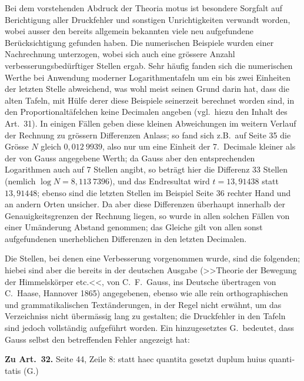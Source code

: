 \documentclass[11pt,a4paper]{article}
\begin{document}

Bei dem vorstehenden Abdruck der Theoria motus ist besondere Sorgfalt auf Berichtigung aller Druckfehler und sonstigen Unrichtigkeiten verwandt worden, wobei ausser den bereits allgemein bekannten viele neu aufgefundene Berücksichtigung gefunden haben. Die numerischen Beispiele wurden einer Nachrechnung unterzogen, wobei sich auch eine grössere Anzahl verbesserungsbedürftiger Stellen ergab. Sehr häufig fanden sich die numerischen Werthe bei Anwendung moderner Logarithmentafeln um ein bis zwei Einheiten der letzten Stelle abweichend, was wohl meist seinen Grund darin hat, dass die alten Tafeln, mit Hülfe derer diese Beispiele seinerzeit berechnet worden sind, in den Proportionaltäfelchen keine Decimalen angeben (vgl.\ hiezu den Inhalt des Art.~31). In einigen Fällen geben diese kleinen Abweichungen im weitern Verlauf der Rechnung zu grössern Differenzen Anlass; so fand sich z.B.\ auf Seite 35 die Grösse $N$ gleich $0{,}012\ 9939$, also nur um eine Einheit der 7.\ Decimale kleiner als der von Gauss angegebene Werth; da Gauss aber den entsprechenden Logarithmen auch auf 7 Stellen angibt, so beträgt hier die Differenz 33 Stellen (nemlich $\log N = 8{,}113\ 7396$), und das Endresultat wird $t = 13{,}91438$ statt $13{,}91448$; ebenso sind die letzten Stellen im Beispiel Seite 36 rechter Hand und an andern Orten unsicher. Da aber diese Differenzen überhaupt innerhalb der Genauigkeitsgrenzen der Rechnung liegen, so wurde in allen solchen Fällen von einer Umänderung Abstand genommen; das Gleiche gilt von allen sonst aufgefundenen unerheblichen Differenzen in den letzten Decimalen.

Die Stellen, bei denen eine Verbesserung vorgenommen wurde, sind die folgenden; hiebei sind aber die bereits in der deutschen Ausgabe (\foreignlanguage{ngerman}{>>Theorie der Bewegung der Himmelskörper etc.<<, von C.~F.~Gauss, ins Deutsche übertragen von C.~Haase, Hannover 1865}) angegebenen, ebenso wie alle rein orthographischen und grammatikalischen Textänderungen, in der Regel nicht erwähnt, um das Verzeichniss nicht übermässig lang zu gestalten; die Druckfehler in den Tafeln sind jedoch vollständig aufgeführt worden. Ein hinzugesetztes G.\ bedeutet, dass Gauss selbst den betreffenden Fehler angezeigt hat:

\vspace{0.5em}
\noindent\textbf{Zu Art.~32.} Seite 44, Zeile 8: statt \foreignlanguage{ngerman}{haec quantita} gesetzt \foreignlanguage{ngerman}{duplum huius quantitatis} (G.)
\end{document}
